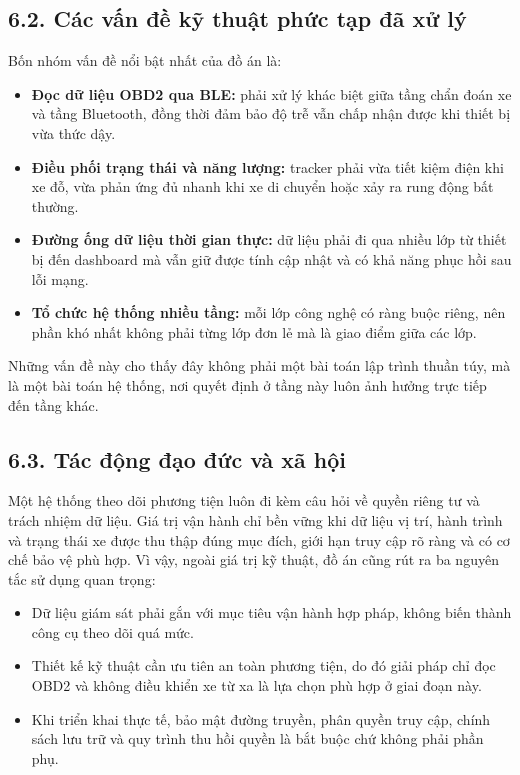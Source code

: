 \documentclass[a4paper]{extarticle}
\providecommand{\tightlist}{%
  \setlength{\itemsep}{0pt}\setlength{\parskip}{0pt}}
\begin{document}
\subsection{6.2. Các vấn đề kỹ thuật phức tạp đã xử lý}

Bốn nhóm vấn đề nổi bật nhất của đồ án là:

\begin{itemize}
\tightlist
\item
  \textbf{Đọc dữ liệu OBD2 qua BLE:} phải xử lý khác biệt giữa tầng chẩn đoán xe và tầng Bluetooth, đồng thời đảm bảo độ trễ vẫn chấp nhận được khi thiết bị vừa thức dậy.
\item
  \textbf{Điều phối trạng thái và năng lượng:} tracker phải vừa tiết kiệm điện khi xe đỗ, vừa phản ứng đủ nhanh khi xe di chuyển hoặc xảy ra rung động bất thường.
\item
  \textbf{Đường ống dữ liệu thời gian thực:} dữ liệu phải đi qua nhiều lớp từ thiết bị đến dashboard mà vẫn giữ được tính cập nhật và có khả năng phục hồi sau lỗi mạng.
\item
  \textbf{Tổ chức hệ thống nhiều tầng:} mỗi lớp công nghệ có ràng buộc riêng, nên phần khó nhất không phải từng lớp đơn lẻ mà là giao điểm giữa các lớp.
\end{itemize}

Những vấn đề này cho thấy đây không phải một bài toán lập trình thuần túy, mà là một bài toán hệ thống, nơi quyết định ở tầng này luôn ảnh hưởng trực tiếp đến tầng khác.

\subsection{6.3. Tác động đạo đức và xã hội}

Một hệ thống theo dõi phương tiện luôn đi kèm câu hỏi về quyền riêng tư và trách nhiệm dữ liệu. Giá trị vận hành chỉ bền vững khi dữ liệu vị trí, hành trình và trạng thái xe được thu thập đúng mục đích, giới hạn truy cập rõ ràng và có cơ chế bảo vệ phù hợp. Vì vậy, ngoài giá trị kỹ thuật, đồ án cũng rút ra ba nguyên tắc sử dụng quan trọng:

\begin{itemize}
\tightlist
\item
  Dữ liệu giám sát phải gắn với mục tiêu vận hành hợp pháp, không biến thành công cụ theo dõi quá mức.
\item
  Thiết kế kỹ thuật cần ưu tiên an toàn phương tiện, do đó giải pháp chỉ đọc OBD2 và không điều khiển xe từ xa là lựa chọn phù hợp ở giai đoạn này.
\item
  Khi triển khai thực tế, bảo mật đường truyền, phân quyền truy cập, chính sách lưu trữ và quy trình thu hồi quyền là bắt buộc chứ không phải phần phụ.
\end{itemize}
\end{document}
